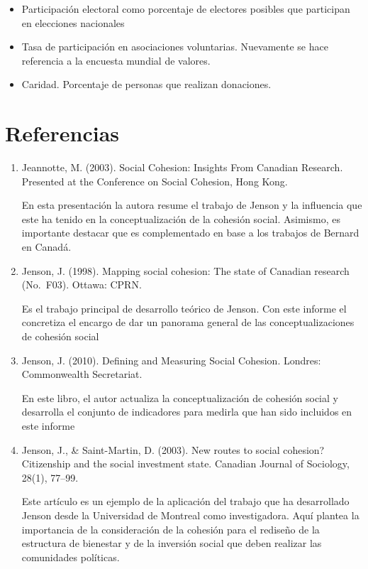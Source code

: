 \documentclass[
  12pt,
]{book}
\providecommand{\tightlist}{%
  \setlength{\itemsep}{0pt}\setlength{\parskip}{0pt}}
\begin{document}
\begin{itemize}
\tightlist
\item
  Participación electoral como porcentaje de electores posibles que participan en elecciones nacionales
\item
  Tasa de participación en asociaciones voluntarias. Nuevamente se hace referencia a la encuesta mundial de valores.
\item
  Caridad. Porcentaje de personas que realizan donaciones.
\end{itemize}

\hypertarget{referencias}{%
\section{Referencias}\label{referencias}}

\begin{enumerate}
\def\labelenumi{\arabic{enumi}.}
\item
  Jeannotte, M. (2003). Social Cohesion: Insights From Canadian
  Research. Presented at the Conference on Social Cohesion, Hong Kong.

  En esta presentación la autora resume el trabajo de Jenson y la influencia que este ha tenido en la conceptualización de la cohesión social. Asimismo, es importante destacar que es complementado en base a los trabajos de Bernard en Canadá.
\item
  Jenson, J. (1998). Mapping social cohesion: The state of Canadian
  research (No.~F03). Ottawa: CPRN.

  Es el trabajo principal de desarrollo teórico de Jenson. Con este informe el concretiza el encargo de dar un panorama general de las conceptualizaciones de cohesión social
\item
  Jenson, J. (2010). Defining and Measuring Social Cohesion. Londres:
  Commonwealth Secretariat.

  En este libro, el autor actualiza la conceptualización de cohesión social y desarrolla el conjunto de indicadores para medirla que han sido incluidos en este informe
\item
  Jenson, J., \& Saint-Martin, D. (2003). New routes to social cohesion? Citizenship and the social investment state. Canadian
  Journal of Sociology, 28(1), 77--99.

  Este artículo es un ejemplo de la aplicación del trabajo que ha desarrollado Jenson desde la Universidad de Montreal como investigadora. Aquí plantea la importancia de la consideración de la cohesión para el rediseño de la estructura de bienestar y de la inversión social que deben realizar las comunidades políticas.
\end{enumerate}
\end{document}
